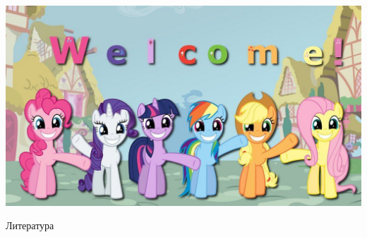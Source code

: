 \documentclass[11pt,aspectratio=169,handout=true]{beamer}
\begin{document}
\begin{frame}{}

\begin{center}
\includegraphics[scale=1.0]{images/welcome.jpeg}
\end{center}

\end{frame}

\begin{frame}[allowframebreaks]{Литература}


\end{frame}
\end{document}
